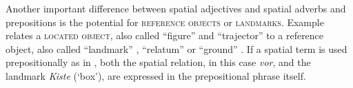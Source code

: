 Another important difference between spatial adjectives and spatial adverbs and prepositions is the potential
for \textsc{reference objects} or \textsc{landmarks}. Example 
 relates a \textsc{located object}, also called
``figure'' \citep{talmy2000toward2} and ``trajector'' \citep{vandeloise1991spatial}
to a reference object, also called ``landmark'' \citep{vandeloise1991spatial}, 
``relatum'' \citep{tenbrink2007space} or ``ground'' \citep{talmy2000toward2}.
If a spatial term is used prepositionally as in 
, both the spatial relation, in this case 
\textit{vor}, and the landmark \textit{Kiste} (`box'), are expressed in the 
prepositional phrase itself. 

